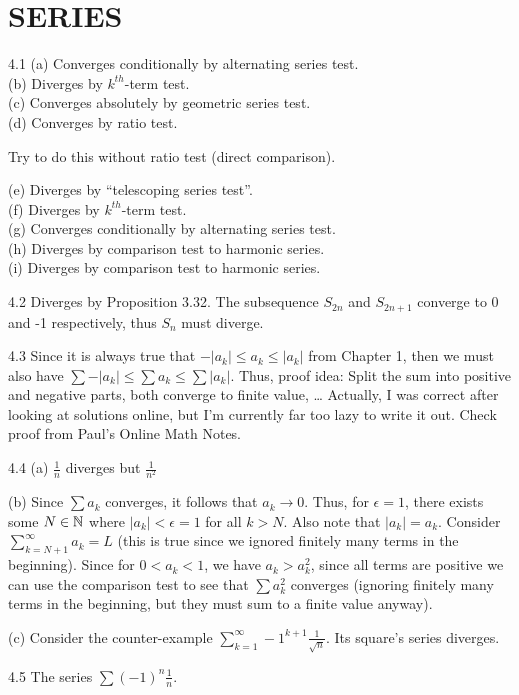 \section{SERIES}
4.1 (a) Converges conditionally by alternating series test.\\
(b) Diverges by $k^{th}$-term test.\\
(c) Converges absolutely by geometric series test.\\
(d) Converges by ratio test.
\begin{remark}
    Try to do this without ratio test (direct comparison).
\end{remark}
(e) Diverges by ``telescoping series test''. \\
(f) Diverges by $k^{th}$-term test.\\
(g) Converges conditionally by alternating series test.\\
(h) Diverges by comparison test to harmonic series.\\
(i) Diverges by comparison test to harmonic series.

4.2 Diverges by Proposition 3.32. The subsequence $S_{2n}$ and $S_{2n+1}$ converge to 0 and -1
respectively, thus $S_n$ must diverge.

4.3 Since it is always true that $-|a_k| \leq a_k \leq |a_k|$ from Chapter 1, then we must also have
$\sum -|a_k| \leq \sum a_k \leq \sum |a_k|$. Thus, proof idea: Split the sum into positive and negative parts, both converge to finite value, \dots
Actually, I was correct after looking at solutions online, but I'm currently far too lazy to write it out. Check proof from Paul's Online Math Notes.
    
4.4 (a) $\frac{1}{n}$ diverges but $\frac{1}{n^2}$

(b) Since $\sum a_k$ converges, it follows that $a_k \rightarrow 0$. Thus, for $\epsilon=1$, there
exists some $N \in \mathbb{N}$ where $|a_k| < \epsilon = 1$ for all $k > N$. Also note that $|a_k|=a_k$. Consider $\sum_{k=N+1}^{\infty}a_k=L$ (this is true since we ignored finitely many
terms in the beginning). Since for $0<a_k<1$, we have $a_k > a_k^2$, since all terms are positive we can use the comparison test to
see that $\sum a_k^2$ converges (ignoring finitely many terms in the beginning, but they must sum to a finite value anyway).

(c) Consider the counter-example $\sum_{k=1}^{\infty} -1^{k+1}\frac{1}{\sqrt{n}}$. Its square's series diverges.

4.5 The series $\sum {(-1)}^n \frac{1}{n}$.

